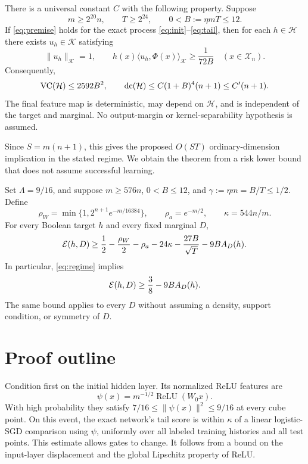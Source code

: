 \documentclass[11pt,letterpaper,pmlr,twoside]{jmlr}
\newcommand{\X}{\mathcal X}\newcommand{\Hc}{\mathcal H}
\newcommand{\Kc}{\mathcal K}\newcommand{\sgn}{\operatorname{sign}}
\newcommand{\relu}{\operatorname{ReLU}}\newcommand{\dc}{\operatorname{dc}}
\newcommand{\ip}[2]{\langle #1,#2\rangle}\newcommand{\norm}[1]{\lVert #1\rVert}
\begin{document}
\begin{theorem}
\label{thm:ordinary}
There is a universal constant $C$ with the following property. Suppose
\begin{equation}
 m\ge2^{20}n,\qquad T\ge2^{24},\qquad 0<B:=\eta mT\le12.
 \label{eq:regime}
\end{equation}
If \eqref{eq:premise} holds for the exact process \eqref{eq:init}--\eqref{eq:tail}, then for each $h\in\Hc$ there exists $u_h\in\Kc$ satisfying
\begin{equation}
 \norm{u_h}_{\Kc}=1,\qquad
 h(x)\ip{u_h}{\Phi(x)}_{\Kc}\ge\frac1{72B}
 \quad(x\in\X_n).
 \label{eq:kernelmargin}
\end{equation}
Consequently,
\begin{equation}
 \VC(\Hc)\le2592B^2,
 \qquad
 \dc(\Hc)\le C(1+B)^4(n+1)\le C'(n+1).
 \label{eq:ordinarybound}
\end{equation}
The final feature map is deterministic, may depend on $\Hc$, and is independent of the target and marginal. No output-margin or kernel-separability hypothesis is assumed.
\end{theorem}

Since $S=m(n+1)$, this gives the proposed $O(ST)$ ordinary-dimension implication in the stated regime. We obtain the theorem from a risk lower bound that does not assume successful learning.

\begin{theorem}
\label{thm:risk}
Set $\Lambda=9/16$, and suppose $m\ge576n$, $0<B\le12$, and $\gamma:=\eta m=B/T\le1/2$. Define
\[
 \rho_W=\min\{1,2^{n+1}e^{-m/16384}\},\qquad
 \rho_a=e^{-m/2},\qquad \kappa=544n/m.
\]
For every Boolean target $h$ and every fixed marginal $D$,
\begin{equation}
 \mathcal E(h,D)\ge\frac12-\frac{\rho_W}{2}-\rho_a
   -24\kappa-\frac{27B}{\sqrt T}-9B A_D(h).
 \label{eq:risk-general}
\end{equation}
In particular, \eqref{eq:regime} implies
\begin{equation}
 \mathcal E(h,D)\ge\frac38-9B A_D(h).
 \label{eq:risk-simple}
\end{equation}
The same bound applies to every $D$ without assuming a density, support condition, or symmetry of $D$.
\end{theorem}

\section{Proof outline}
Condition first on the initial hidden layer. Its normalized ReLU features are
\[
 \psi(x)=m^{-1/2}\relu(W_0x).
\]
With high probability they satisfy $7/16\le\norm{\psi(x)}^2\le9/16$ at every cube point. On this event, the exact network's tail score is within $\kappa$ of a linear logistic-SGD comparison using $\psi$, uniformly over all labeled training histories and all test points. This estimate allows gates to change. It follows from a bound on the input-layer displacement and the global Lipschitz property of ReLU.
\end{document}
